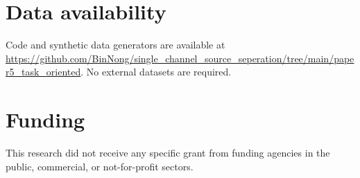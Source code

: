 \documentclass[review,12pt]{elsarticle}
\begin{document}
\section*{Data availability}
Code and synthetic data generators are available at
\url{https://github.com/BinNong/single_channel_source_seperation/tree/main/paper5_task_oriented}.
No external datasets are required.

\section*{Funding}
This research did not receive any specific grant from funding agencies
in the public, commercial, or not-for-profit sectors.

\end{document}
